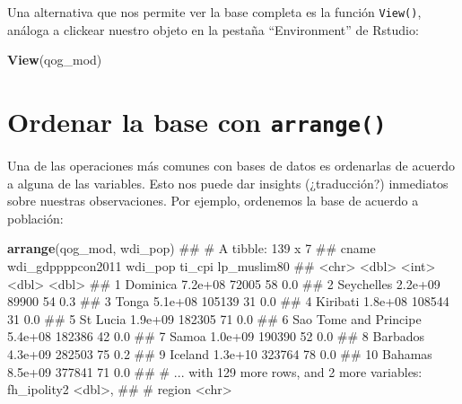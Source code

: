 \documentclass[]{book}
\newenvironment{Shaded}{\begin{snugshade}}{\end{snugshade}}
\newcommand{\KeywordTok}[1]{\textcolor[rgb]{0.13,0.29,0.53}{\textbf{#1}}}
\newcommand{\NormalTok}[1]{#1}
\begin{document}
Una alternativa que nos permite ver la base completa es la función
\texttt{View()}, análoga a clickear nuestro objeto en la pestaña
``Environment'' de Rstudio:

\begin{Shaded}
\begin{Highlighting}[]
\KeywordTok{View}\NormalTok{(qog_mod)}
\end{Highlighting}
\end{Shaded}

\section{\texorpdfstring{Ordenar la base con
\texttt{arrange()}}{Ordenar la base con arrange()}}\label{ordenar-la-base-con-arrange}

Una de las operaciones más comunes con bases de datos es ordenarlas de
acuerdo a alguna de las variables. Esto nos puede dar insights
(¿traducción?) inmediatos sobre nuestras observaciones. Por ejemplo,
ordenemos la base de acuerdo a población:

\begin{Shaded}
\begin{Highlighting}[]
\KeywordTok{arrange}\NormalTok{(qog_mod, wdi_pop)}
\NormalTok{## # A tibble: 139 x 7}
\NormalTok{##                    cname wdi_gdppppcon2011 wdi_pop ti_cpi lp_muslim80}
\NormalTok{##                    <chr>             <dbl>   <int>  <dbl>       <dbl>}
\NormalTok{##  1              Dominica           7.2e+08   72005     58         0.0}
\NormalTok{##  2            Seychelles           2.2e+09   89900     54         0.3}
\NormalTok{##  3                 Tonga           5.1e+08  105139     31         0.0}
\NormalTok{##  4              Kiribati           1.8e+08  108544     31         0.0}
\NormalTok{##  5              St Lucia           1.9e+09  182305     71         0.0}
\NormalTok{##  6 Sao Tome and Principe           5.4e+08  182386     42         0.0}
\NormalTok{##  7                 Samoa           1.0e+09  190390     52         0.0}
\NormalTok{##  8              Barbados           4.3e+09  282503     75         0.2}
\NormalTok{##  9               Iceland           1.3e+10  323764     78         0.0}
\NormalTok{## 10               Bahamas           8.5e+09  377841     71         0.0}
\NormalTok{## # ... with 129 more rows, and 2 more variables: fh_ipolity2 <dbl>,}
\NormalTok{## #   region <chr>}
\end{Highlighting}
\end{Shaded}
\end{document}
